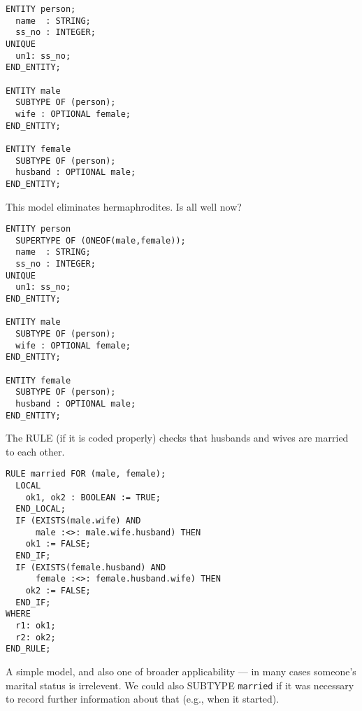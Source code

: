 
\begin{verbatim}
ENTITY person;
  name  : STRING;
  ss_no : INTEGER;
UNIQUE
  un1: ss_no;
END_ENTITY;

ENTITY male
  SUBTYPE OF (person);
  wife : OPTIONAL female;
END_ENTITY;

ENTITY female
  SUBTYPE OF (person);
  husband : OPTIONAL male;
END_ENTITY;
\end{verbatim}


\begin{remarks}
\remintro
{}

    This model eliminates hermaphrodites. 
Is all well now?

\remend
\end{remarks}


\begin{verbatim}
ENTITY person
  SUPERTYPE OF (ONEOF(male,female));
  name  : STRING;
  ss_no : INTEGER;
UNIQUE
  un1: ss_no;
END_ENTITY;

ENTITY male
  SUBTYPE OF (person);
  wife : OPTIONAL female;
END_ENTITY;

ENTITY female
  SUBTYPE OF (person);
  husband : OPTIONAL male;
END_ENTITY;
\end{verbatim}


\begin{remarks}
\remintro
{}

    The RULE (if it is coded properly) checks that
husbands and wives are married to each other.

\remend
\end{remarks}


\begin{verbatim}
RULE married FOR (male, female);
  LOCAL
    ok1, ok2 : BOOLEAN := TRUE;
  END_LOCAL;
  IF (EXISTS(male.wife) AND 
      male :<>: male.wife.husband) THEN
    ok1 := FALSE;
  END_IF;
  IF (EXISTS(female.husband) AND
      female :<>: female.husband.wife) THEN
    ok2 := FALSE;
  END_IF;
WHERE
  r1: ok1;
  r2: ok2;
END_RULE;
\end{verbatim}


\begin{remarks}
\remintro
{}

A simple model, and also one of broader applicability ---
in many cases someone's marital status is irrelevent.
We could also SUBTYPE \texttt{married} if it was necessary to
record further information about that (e.g., when it started).

\remend
\end{remarks}

